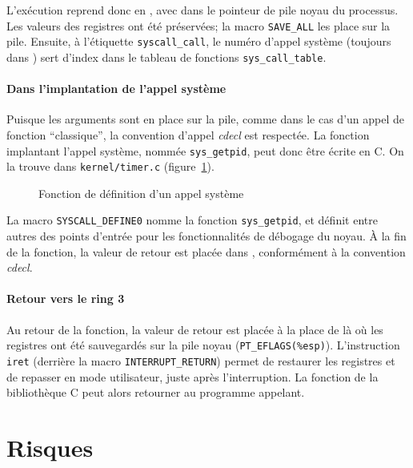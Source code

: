 
L'exécution reprend donc en , avec dans \esp{} le pointeur de pile noyau
du processus. Les valeurs des registres ont été préservées; la macro
\texttt{SAVE\_ALL} les place sur la pile. Ensuite, à l'étiquette
\texttt{syscall\_call}, le numéro d'appel système (toujours dans \eax) sert
d'index dans le tableau de fonctions \texttt{sys\_call\_table}.


\paragraph{Dans l'implantation de l'appel système}

Puisque les arguments sont en place sur la pile, comme dans le cas d'un appel de
fonction \enquote{classique}, la convention d'appel \emph{cdecl} est respectée.
La fonction implantant l'appel système, nommée \texttt{sys\_getpid}, peut donc
être écrite en C. On la trouve dans \texttt{kernel/timer.c}
(figure~\ref{fig:syscall-def}).

\begin{figure}[h]
    \caption{Fonction de définition d'un appel système}
    \label{fig:syscall-def}
\end{figure}


La macro \texttt{SYSCALL\_DEFINE0} nomme la fonction \texttt{sys\_getpid}, et
définit entre autres des points d'entrée pour les fonctionnalités de débogage du
noyau. À la fin de la fonction, la valeur de retour est placée dans \eax,
conformément à la convention \emph{cdecl}.

\paragraph{Retour vers le ring 3}

Au retour de la fonction, la valeur de retour est placée à la place de \eax{} là
où les registres ont été sauvegardés sur la pile noyau
(\texttt{PT\_EFLAGS(\%esp)}). %
L'instruction \texttt{iret} (derrière la macro
\texttt{INTERRUPT\_RETURN}) permet de restaurer les registres et de repasser en
mode utilisateur, juste après l'interruption. La fonction de la bibliothèque C
peut alors retourner au programme appelant.

\section{Risques}
\label{sec:risques-dos}

